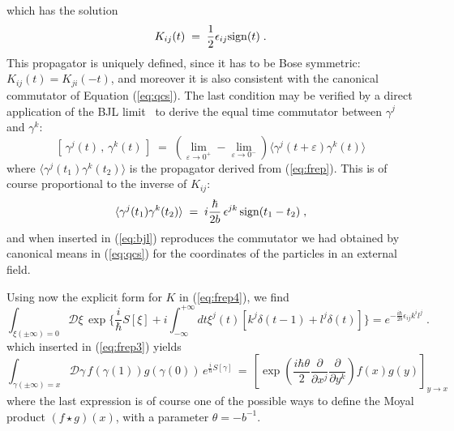 \documentclass[a4paper,12pt]{article}
\begin{document}
which has the solution
\begin{equation}
  \label{eq:frep6}
K_{ij} (t) \;=\; \frac{1}{2} \epsilon_{ij} {\rm sign}(t) \;.
\end{equation}
This propagator is uniquely defined, since it has to be Bose
symmetric: $K_{ij}(t)=K_{ji}(-t)$, and moreover it is also
consistent
with the canonical commutator of Equation (\ref{eq:qcs}). The last
condition may be verified by a direct application of the BJL
limit~\cite{BJL} to derive the equal time commutator between
$\gamma^j$ and
$\gamma^k$:
\begin{equation}
  \label{eq:bjl}
[\,\gamma^j(t)\,,\,\gamma^k(t)\,] \;=\; (\lim_{\varepsilon \to
0^+}- \lim_{\varepsilon \to 0^-}) \langle \gamma^j(t+\varepsilon)
\gamma^k(t) \rangle  
\end{equation} 
where $\langle \gamma^j(t_1) \gamma^k(t_2) \rangle$ is the
propagator derived from
(\ref{eq:frep}).  This is of course proportional to the inverse of
$K_{ij}$:
\begin{equation}
  \label{eq:bjl1}
\langle \gamma^j(t_1) \gamma^k(t_2) \rangle \;=\; i \frac{\hbar}{2
b} \,\epsilon^{jk}\, {\rm sign}(t_1-t_2) \;,
\end{equation}
and when inserted in (\ref{eq:bjl}) reproduces the commutator we
had
obtained by canonical means in (\ref{eq:qcs}) for the coordinates
of
the particles in an external field.

Using now the explicit form for $K$ in (\ref{eq:frep4}), we find
\begin{equation}
   \label{eq:frep7}
\int_{\xi (\pm \infty)=0} {\mathcal D}\xi \, \exp\{\frac{i}{\hbar}
S[\xi] + i \int_{-\infty}^{+\infty} dt \xi^j(t) [k^j \delta(t-1)
+l^j \delta(t)]\}= e^{-\frac{i \hbar}{2 b}\epsilon_{ij} k^i l^j }
\;.
\end{equation}
which inserted in (\ref{eq:frep3}) yields
\begin{equation}
\label{eq:frep8} 
 \int_{\gamma(\pm \infty)=x} {\mathcal D}\gamma \, f(\gamma(1))
g(\gamma(0))\, e^{\frac{i}{\hbar}S[\gamma]}\,=\,
\left[\exp(\frac{i \hbar \theta}{2} \frac{\partial}{\partial x^j}
\frac{\partial}{\partial y^k} ) f(x) g(y)
\right]_{y \to x}   
\end{equation}
where the last expression is of course one of the possible ways to
define the Moyal product $(f \star g)(x)$, with a parameter $\theta
= -
b^{-1}$.
\end{document}
